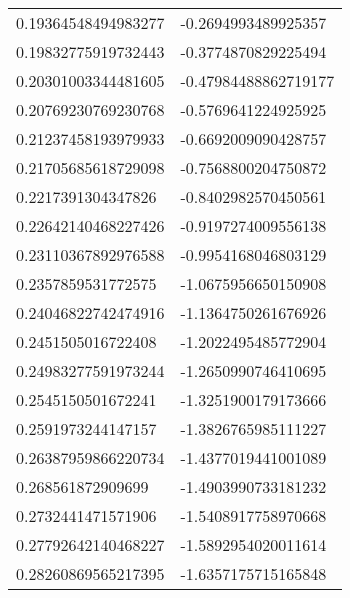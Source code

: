 \begin{supertabular}{ll}
0.19364548494983277 & -0.2694993489925357  \\
0.19832775919732443 & -0.3774870829225494  \\
0.20301003344481605 & -0.47984488862719177 \\
0.20769230769230768 & -0.5769641224925925  \\
0.21237458193979933 & -0.6692009090428757  \\
0.21705685618729098 & -0.7568800204750872  \\
0.2217391304347826  & -0.8402982570450561  \\
0.22642140468227426 & -0.9197274009556138  \\
0.23110367892976588 & -0.9954168046803129  \\
0.2357859531772575  & -1.0675956650150908  \\
0.24046822742474916 & -1.1364750261676926  \\
0.2451505016722408  & -1.2022495485772904  \\
0.24983277591973244 & -1.2650990746410695  \\
0.2545150501672241  & -1.3251900179173666  \\
0.2591973244147157  & -1.3826765985111227  \\
0.26387959866220734 & -1.4377019441001089  \\
0.268561872909699   & -1.4903990733181232  \\
0.2732441471571906  & -1.5408917758970668  \\
0.27792642140468227 & -1.5892954020011614  \\
0.28260869565217395 & -1.6357175715165848  \\
\end{supertabular}
